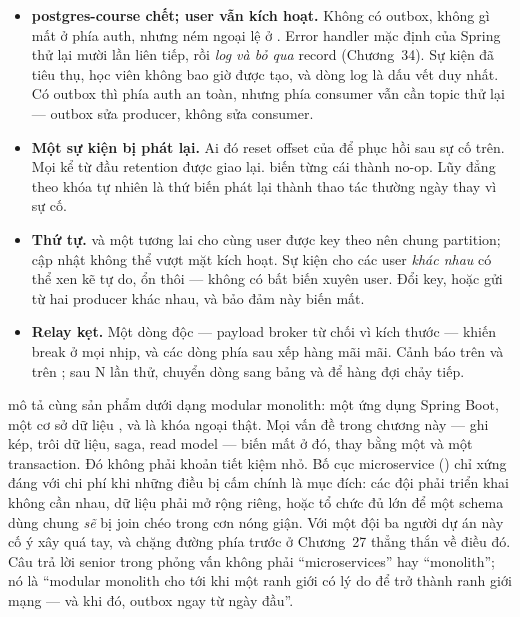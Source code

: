 \begin{itemize}
  \item \textbf{postgres-course chết; user vẫn kích hoạt.} Không có
  outbox, không gì mất ở phía auth, nhưng 
  ném ngoại lệ ở . Error handler mặc định của Spring thử
  lại mười lần liên tiếp, rồi \emph{log và bỏ qua} record (Chương~34).
  Sự kiện đã tiêu thụ, học viên không bao giờ được tạo, và dòng log là
  dấu vết duy nhất. Có outbox thì phía auth an toàn, nhưng phía consumer
  vẫn cần topic thử lại --- outbox sửa producer, không sửa consumer.
  \item \textbf{Một sự kiện bị phát lại.} Ai đó reset offset của
   để phục hồi sau sự cố trên. Mọi
   kể từ đầu retention được giao lại.
   biến từng cái thành no-op. Lũy đẳng
  theo khóa tự nhiên là thứ biến phát lại thành thao tác thường ngày
  thay vì sự cố.
  \item \textbf{Thứ tự.}  và một
   tương lai cho cùng user được key theo
   nên chung partition; cập nhật không thể vượt mặt kích
  hoạt. Sự kiện cho các user \emph{khác nhau} có thể xen kẽ tự do, ổn
  thôi --- không có bất biến xuyên user. Đổi key, hoặc gửi từ hai
  producer khác nhau, và bảo đảm này biến mất.
  \item \textbf{Relay kẹt.} Một dòng độc --- payload broker từ chối vì
  kích thước --- khiến  break ở mọi nhịp, và các dòng phía sau xếp
  hàng mãi mãi. Cảnh báo trên  và trên
  ; sau N lần thử, chuyển
  dòng sang bảng  và để hàng đợi chảy tiếp.
\end{itemize}

\begin{decision}
 mô tả cùng sản phẩm dưới dạng modular monolith: một
ứng dụng Spring Boot, một cơ sở dữ liệu , và
 là khóa ngoại thật. Mọi vấn đề trong chương này
--- ghi kép, trôi dữ liệu, saga, read model --- biến mất ở đó, thay bằng
một  và một transaction. Đó không phải khoản tiết kiệm nhỏ.
Bố cục microservice () chỉ xứng đáng với chi phí khi những
điều bị cấm chính là mục đích: các đội phải triển khai không cần nhau,
dữ liệu phải mở rộng riêng, hoặc tổ chức đủ lớn để một schema dùng
chung \emph{sẽ} bị join chéo trong cơn nóng giận. Với một đội ba người
dự án này cố ý xây quá tay, và chặng đường phía trước ở Chương~27
thẳng thắn về điều đó. Câu trả lời senior trong phỏng vấn không phải
``microservices'' hay ``monolith''; nó là ``modular monolith cho tới
khi một ranh giới có lý do để trở thành ranh giới mạng --- và khi đó,
outbox ngay từ ngày đầu''.
\end{decision}

